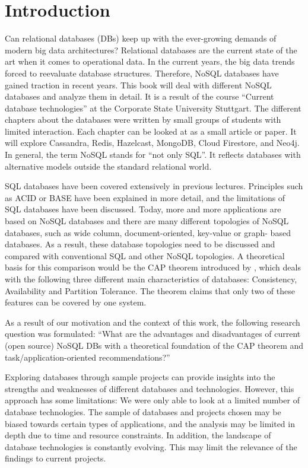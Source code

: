 
\chapter{Introduction}
Can relational databases (DBs) keep up with the ever-growing demands of modern
big data architectures? Relational databases are the current state of the art
when it comes to operational data. In the current years, the big data trends
forced to reevaluate database structures. Therefore, NoSQL databases have gained
traction in recent years. This book will deal with different NoSQL databases and
analyze them in detail. It is a result of the course “Current database
technologies” at the Corporate State University Stuttgart. The different
chapters about the databases were written by small groups of students with
limited interaction. Each chapter can be looked at as a small article or paper.
It will explore Cassandra, Redis, Hazelcast, MongoDB, Cloud Firestore, and
Neo4j. In general, the term NoSQL stands for “not only SQL”. It reflects
databases with alternative models outside the standard relational world.

SQL databases have been covered extensively in previous lectures. Principles
such as ACID or BASE have been explained in more detail, and the limitations of
SQL databases have been discussed. Today, more and more applications are based
on NoSQL databases \parencite{solid_it_gmbh_db-engines_2023} and there are many
different topologies of NoSQL databases, such as wide column, document-oriented,
key-value or graph- based databases. As a result, these database topologies need
to be discussed and compared with conventional SQL and other NoSQL topologies. A
theoretical basis for this comparison would be the CAP theorem introduced by
\textcite{brewer_towards_2000}, which deals with the following three different
main characteristics of databases: Consistency, Availability and Partition
Tolerance. The theorem claims that only two of these features can be covered by
one system.

As a result of our motivation and the context of this work, the following
research question was formulated: \enquote{What are the advantages and
disadvantages of current (open source) NoSQL DBs with a theoretical foundation
of the CAP theorem \parencite{brewer_towards_2000} and task/application-oriented
recommendations?}


Exploring databases through sample projects can provide insights into the
strengths and weaknesses of different databases and technologies. However, this
approach has some limitations: We were only able to look at a limited number of
database technologies. The sample of databases and projects chosen may be biased
towards certain types of applications, and the analysis may be limited in depth
due to time and resource constraints. In addition, the landscape of database
technologies is constantly evolving. This may limit the relevance of the
findings to current projects.

